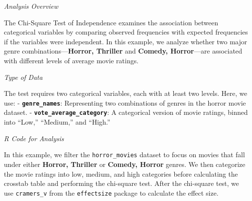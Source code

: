 \documentclass[
]{book}
\begin{document}
\emph{Analysis Overview}

The Chi-Square Test of Independence examines the association between categorical variables by comparing observed frequencies with expected frequencies if the variables were independent. In this example, we analyze whether two major genre combinations---\textbf{Horror, Thriller} and \textbf{Comedy, Horror}---are associated with different levels of average movie ratings.

\emph{Type of Data}

The test requires two categorical variables, each with at least two levels. Here, we use: - \textbf{\texttt{genre\_names}}: Representing two combinations of genres in the horror movie dataset. - \textbf{\texttt{vote\_average\_category}}: A categorical version of movie ratings, binned into ``Low,'' ``Medium,'' and ``High.''

\emph{R Code for Analysis}

In this example, we filter the \texttt{horror\_movies} dataset to focus on movies that fall under either \textbf{Horror, Thriller} or \textbf{Comedy, Horror} genres. We then categorize the movie ratings into low, medium, and high categories before calculating the crosstab table and performing the chi-square test. After the chi-square test, we use \texttt{cramers\_v} from the \texttt{effectsize} package to calculate the effect size.
\end{document}
